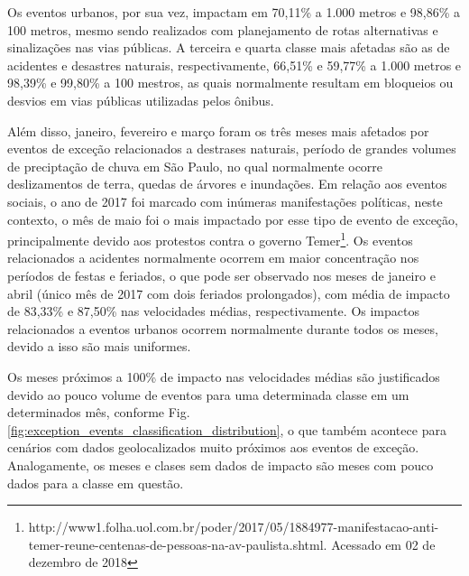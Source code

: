 \documentclass[
	12pt,				%
	oneside,			%
	a4paper,			%
	english,			%
	brazil				%
	]{abntex2ppgsi}
\begin{document}
{{Os eventos urbanos, por sua vez, impactam em 70,11\% a 1.000 metros e 98,86\% a 100 metros, mesmo sendo realizados com planejamento de rotas alternativas e sinalizações nas vias públicas. A terceira e quarta classe mais afetadas são as de acidentes e desastres naturais, respectivamente, 66,51\% e 59,77\% a 1.000 metros e 98,39\% e 99,80\% a 100 mestros, as quais normalmente resultam em bloqueios ou desvios em vias públicas utilizadas pelos ônibus. 

Além disso, janeiro, fevereiro e março foram os três meses mais afetados por eventos de exceção relacionados a destrases naturais, período de grandes volumes de preciptação de chuva em São Paulo, no qual normalmente ocorre deslizamentos de terra, quedas de árvores e inundações.  Em relação aos eventos sociais, o ano de 2017 foi marcado com inúmeras manifestações políticas, neste contexto, o mês de maio foi o mais impactado por esse tipo de evento de exceção, principalmente devido aos protestos contra o governo Temer\footnote{{http://www1.folha.uol.com.br/poder/2017/05/1884977-manifestacao-anti-temer-reune-centenas-de-pessoas-na-av-paulista.shtml}. Acessado em 02 de dezembro de 2018}. Os eventos relacionados a acidentes normalmente ocorrem em maior concentração nos períodos de festas e feriados, o que pode ser observado nos meses de janeiro e abril (único mês de 2017 com dois feriados prolongados), com média de impacto de 83,33\% e 87,50\% nas velocidades médias, respectivamente.  Os impactos relacionados a eventos urbanos ocorrem normalmente durante todos os meses, devido a isso são mais uniformes.

Os meses próximos a 100\% de impacto nas velocidades médias são justificados devido ao pouco volume de eventos para uma determinada classe em um determinados mês, conforme Fig. \ref{fig:exception_events_classification_distribution}, o que também acontece para cenários com dados geolocalizados muito próximos aos eventos de exceção. Analogamente, os meses e clases sem dados de impacto são meses com pouco dados para a classe em questão. 


}}
\end{document}
